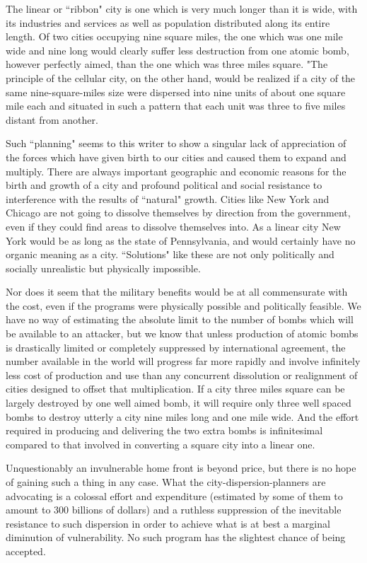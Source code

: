 The linear or ``ribbon" city is one which is very much longer than it is wide, with its industries and services as well as population distributed along its entire length. Of two cities occupying nine square miles, the one which was one mile wide and nine long would clearly suffer less destruction from one atomic bomb, however perfectly aimed, than the one which was three miles square. "The principle of the cellular city, on the other hand, would be realized if a city of the same nine-square-miles size were dispersed into nine units of about one square mile each and situated in such a pattern that each unit was three to five miles distant from another.

Such ``planning" seems to this writer to show a singular lack of appreciation of the forces which have given birth to our cities and caused them to expand and multiply. There are always important geographic and economic reasons for the birth and growth of a city and profound political and social resistance to interference with the results of ``natural" growth. Cities like New York and Chicago are not going to dissolve themselves by direction from the government, even if they could find areas to dissolve themselves into. As a linear city New York would be as long as the state of Pennsylvania, and would certainly have no organic meaning as a city. ``Solutions" like these are not only politically and socially unrealistic but physically impossible.

Nor does it seem that the military benefits would be at all commensurate with the cost, even if the programs were physically possible and politically feasible. We have no way of estimating the absolute limit to the number of bombs which will be available to an attacker, but we know that unless production of atomic bombs is drastically limited or completely suppressed by international agreement, the number available in the world will progress far more rapidly and involve infinitely less cost of production and use than any concurrent dissolution or realignment of cities designed to offset that multiplication. If a city three miles square can be largely destroyed by one well aimed bomb, it will require only three well spaced bombs to destroy utterly a city nine miles long and one mile wide. And the effort required in producing and delivering the two extra bombs is infinitesimal compared to that involved in converting a square city into a linear one.

Unquestionably an invulnerable home front is beyond price, but there is no hope of gaining such a thing in any case. What the city-dispersion-planners are advocating is a colossal effort and expenditure (estimated by some of them to amount to 300 billions of dollars) and a ruthless suppression of the inevitable resistance to such dispersion in order to achieve what is at best a marginal diminution of vulnerability. No such program has the slightest chance of being accepted.

